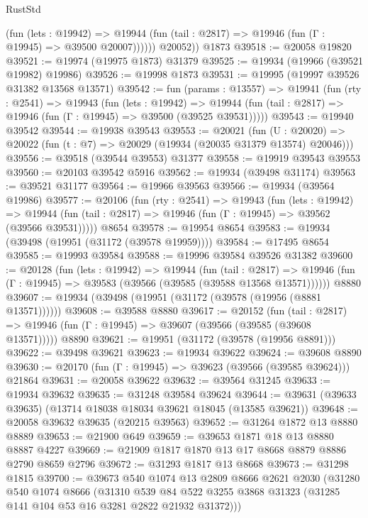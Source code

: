 \begin{lexlean}{RustStd}
\begin{coremodule}
              (fun (lets : @19942) =>
              @19944 (fun (tail : @2817) => @19946 (fun (Γ : @19945) => @39500 @20007))))))
        @20052))
    @1873
@39518 := @20058 @19820
@39521 := @19974 (@19975 @1873) @31379
@39525 := @19934 (@19966 (@39521 @19982) @19986)
@39526 := @19998 @1873
@39531 := @19995 (@19997 @39526 @31382 @13568 @13571)
@39542 := fun (params : @13557) =>
  @19941
    (fun (rty : @2541) =>
    @19943
      (fun (lets : @19942) =>
      @19944 (fun (tail : @2817) => @19946 (fun (Γ : @19945) => @39500 (@39525 @39531)))))
@39543 := @19940 @39542
@39544 := @19938 @39543
@39553 := @20021
    (fun (U : @20020) => @20022 (fun (t : @7) => @20029 (@19934 (@20035 @31379 @13574) @20046)))
@39556 := @39518 (@39544 @39553) @31377
@39558 := @19919 @39543 @39553
@39560 := @20103 @39542 @5916
@39562 := @19934 (@39498 @31174)
@39563 := @39521 @31177
@39564 := @19966 @39563
@39566 := @19934 (@39564 @19986)
@39577 := @20106
    (fun (rty : @2541) =>
    @19943
      (fun (lets : @19942) =>
      @19944 (fun (tail : @2817) => @19946 (fun (Γ : @19945) => @39562 (@39566 @39531)))))
    @8654
@39578 := @19954 @8654
@39583 := @19934 (@39498 (@19951 (@31172 (@39578 @19959))))
@39584 := @17495 @8654
@39585 := @19993 @39584
@39588 := @19996 @39584 @39526 @31382
@39600 := @20128
    (fun (lets : @19942) =>
    @19944
      (fun (tail : @2817) =>
      @19946 (fun (Γ : @19945) => @39583 (@39566 (@39585 (@39588 @13568 @13571))))))
    @8880
@39607 := @19934 (@39498 (@19951 (@31172 (@39578 (@19956 (@8881 @13571))))))
@39608 := @39588 @8880
@39617 := @20152
    (fun (tail : @2817) => @19946 (fun (Γ : @19945) => @39607 (@39566 (@39585 (@39608 @13571)))))
    @8890
@39621 := @19951 (@31172 (@39578 (@19956 @8891)))
@39622 := @39498 @39621
@39623 := @19934 @39622
@39624 := @39608 @8890
@39630 := @20170 (fun (Γ : @19945) => @39623 (@39566 (@39585 @39624))) @21864
@39631 := @20058 @39622
@39632 := @39564 @31245
@39633 := @19934 @39632
@39635 := @31248 @39584 @39624
@39644 := @39631 (@39633 @39635) (@13714 @18038 @18034 @39621 @18045 (@13585 @39621))
@39648 := @20058 @39632 @39635 (@20215 @39563)
@39652 := @31264 @1872 @13 @8880 @8889
@39653 := @21900 @649
@39659 := @39653 @1871 @18 @13 @8880 @8887 @4227
@39669 := @21909 @1817 @1870 @13 @17 @8668 @8879 @8886 @2790 @8659 @2796
@39672 := @31293 @1817 @13 @8668
@39673 := @31298 @1815
@39700 := @39673
    @540
    @1074
    @13
    @2809
    @8666
    @2621
    @2030
    (@31280
      @540
      @1074
      @8666
      (@31310
        @539
        @84
        @522
        @3255
        @3868
        @31323
        (@31285 @141 @104 @53 @16 @3281 @2822 @21932 @31372)))

\end{coremodule}
\end{lexlean}
